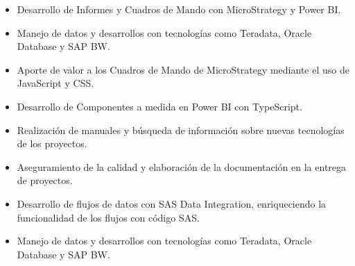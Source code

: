 \documentclass[10pt,a4paper,ragged2e]{altacv}
\begin{document}

\begin{fullwidth}
\makecvheader
\end{fullwidth}



\begin{itemize}
\item Desarrollo de Informes y Cuadros de Mando con MicroStrategy y Power BI.
\item Manejo de datos y desarrollos con tecnologías como Teradata, Oracle Database y SAP BW.
\item Aporte de valor a los Cuadros de Mando de MicroStrategy mediante el uso de JavaScript y CSS.
\item Desarrollo de Componentes a medida en Power BI con TypeScript.
\item Realización de manuales y búsqueda de información sobre nuevas tecnologías de los proyectos.
\item Aseguramiento de la calidad y elaboración de la documentación en la entrega de proyectos.
\item Desarrollo de flujos de datos con SAS Data Integration, enriqueciendo la funcionalidad de los flujos con código SAS.
\item Manejo de datos y desarrollos con tecnologías como Teradata, Oracle Database y SAP BW.
\end{itemize}
\end{document}
